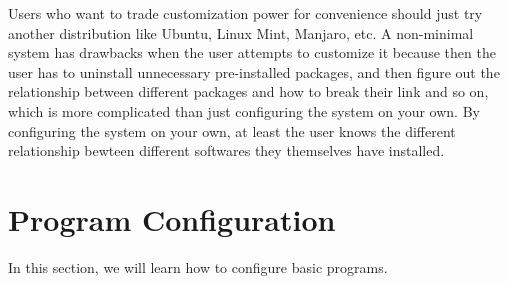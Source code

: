\documentclass[a4paper, 12pt]{report}
\begin{document}
\begin{center}
Users who want to trade customization power for convenience should just try another distribution like Ubuntu, Linux Mint, Manjaro, etc. A non-minimal system has drawbacks when the user attempts to customize it because then the user has to uninstall unnecessary pre-installed packages, and then figure out the relationship between different packages and how to break their link and so on, which is more complicated than just configuring the system on your own. By configuring the system on your own, at least the user knows the different relationship bewteen different softwares they themselves have installed.

\section{Program Configuration}
\begin{comment}
\end{comment}
In this section, we will learn how to configure basic programs. 


\end{center}
\end{document}
